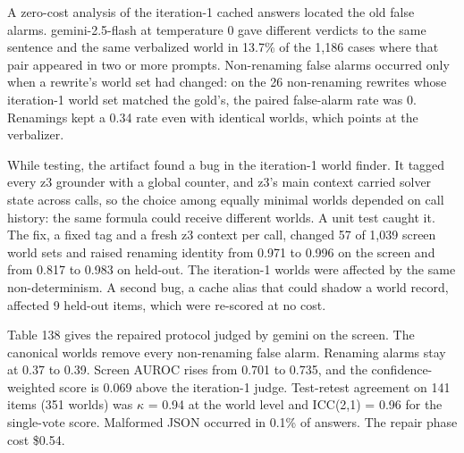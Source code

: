 \documentclass[11pt,letterpaper]{article}
\begin{document}
A zero-cost analysis of the iteration-1 cached answers located the old false alarms. gemini-2.5-flash at temperature 0 gave different verdicts to the same sentence and the same verbalized world in 13.7\% of the 1,186 cases where that pair appeared in two or more prompts. Non-renaming false alarms occurred only when a rewrite's world set had changed: on the 26 non-renaming rewrites whose iteration-1 world set matched the gold's, the paired false-alarm rate was 0. Renamings kept a 0.34 rate even with identical worlds, which points at the verbalizer.

While testing, the artifact found a bug in the iteration-1 world finder. It tagged every z3 grounder with a global counter, and z3's main context carried solver state across calls, so the choice among equally minimal worlds depended on call history: the same formula could receive different worlds. A unit test caught it. The fix, a fixed tag and a fresh z3 context per call, changed 57 of 1,039 screen world sets and raised renaming identity from 0.971 to 0.996 on the screen and from 0.817 to 0.983 on held-out. The iteration-1 worlds were affected by the same non-determinism. A second bug, a cache alias that could shadow a world record, affected 9 held-out items, which were re-scored at no cost.

Table 138 gives the repaired protocol judged by gemini on the screen. The canonical worlds remove every non-renaming false alarm. Renaming alarms stay at 0.37 to 0.39. Screen AUROC rises from 0.701 to 0.735, and the confidence-weighted score is 0.069 above the iteration-1 judge. Test-retest agreement on 141 items (351 worlds) was $\kappa$ = 0.94 at the world level and ICC(2,1) = 0.96 for the single-vote score. Malformed JSON occurred in 0.1\% of answers. The repair phase cost \$0.54.
\end{document}
